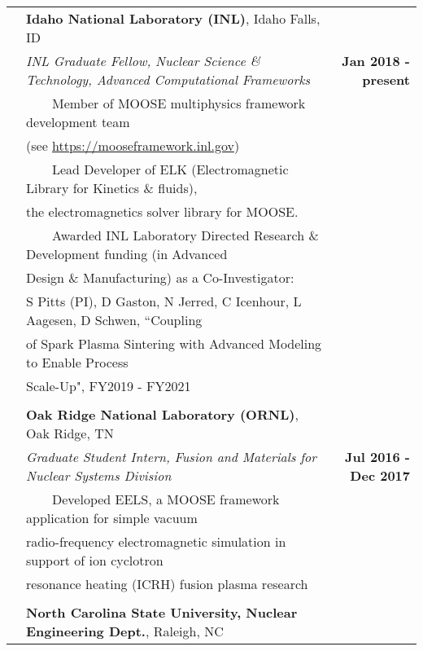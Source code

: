 \documentclass{article}
\newcommand{\tabitem}{~~\textbullet~~}
\begin{document}
\begin{tabularx}{\textwidth}{l X r}
	\hspace{2em} & \textbf{Idaho National Laboratory (INL)}, Idaho Falls, ID & \\
	& \textit{INL Graduate Fellow, Nuclear Science \& Technology, Advanced Computational Frameworks} & \textbf{Jan 2018 - present} \\
	& \tabitem Member of MOOSE multiphysics framework development team & \\
	& \hspace{1.5em} (see \url{https://mooseframework.inl.gov}) & \\
	& \tabitem Lead Developer of ELK (Electromagnetic Library for Kinetics \& fluids), & \\
	& \hspace{1.5em} the electromagnetics solver library for MOOSE. & \\
	& \tabitem Awarded INL Laboratory Directed Research \& Development funding (in Advanced & \\
	& \hspace{1.5em} Design \& Manufacturing) as a Co-Investigator: & \\
	& \hspace{2.5em} S Pitts (PI), D Gaston, N Jerred, C Icenhour, L Aagesen, D Schwen, ``Coupling & \\
	& \hspace{2.5em} of Spark Plasma Sintering with Advanced Modeling to Enable Process & \\
	& \hspace{2.5em} Scale-Up", FY2019 - FY2021 & \\
	& & \\
	& \textbf{Oak Ridge National Laboratory (ORNL)}, Oak Ridge, TN & \\
	& \textit{Graduate Student Intern, Fusion and Materials for Nuclear Systems Division} & \textbf{Jul 2016 - Dec 2017} \\
	& \tabitem Developed EELS, a MOOSE framework application for simple vacuum & \\
	& \hspace{1.5em} radio-frequency electromagnetic simulation in support of ion cyclotron & \\
	& \hspace{1.5em} resonance heating (ICRH) fusion plasma research & \\
	& & \\
	& \textbf{North Carolina State University, Nuclear Engineering Dept.}, Raleigh, NC & \\

\end{tabularx}
\end{document}
